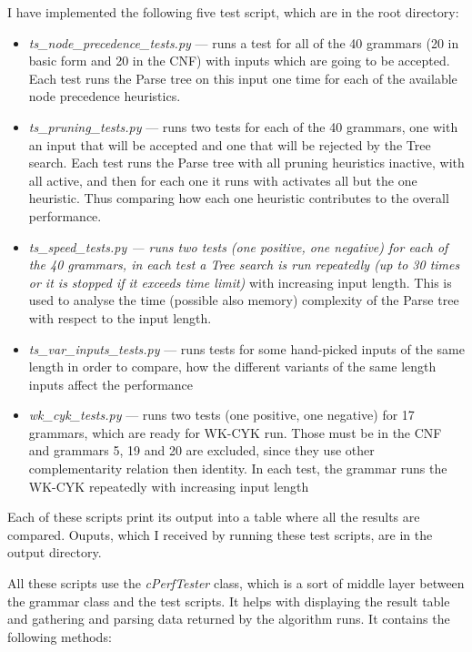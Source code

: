 I have implemented the following five test script, which are in the root directory:
\begin{itemize}
  \item{\textit{ts\_node\_precedence\_tests.py} --- runs a test for all of the 40 grammars (20 in basic form and 20 in the CNF) with inputs which are going to be accepted. Each test runs the Parse tree on this input one time for each of the available node precedence heuristics.}

  \item{\textit{ts\_pruning\_tests.py} --- runs two tests for each of the 40 grammars, one with an input that will be accepted and one that will be rejected by the Tree search. Each test runs the Parse tree with all pruning heuristics inactive, with all active, and then for each one it runs with activates all but the one heuristic. Thus comparing how each one heuristic contributes to the overall performance.}

  \item{\textit{ts\_speed\_tests.py --- runs two tests (one positive, one negative) for each of the 40 grammars, in each test a Tree search is run repeatedly (up to 30 times or it is stopped if it exceeds time limit)} with increasing input length. This is used to analyse the time (possible also memory) complexity of the Parse tree with respect to the input length.}

  \item{\textit{ts\_var\_inputs\_tests.py} --- runs tests for some hand-picked inputs of the same length in order to compare, how the different variants of the same length inputs affect the performance}

  \item{\textit{wk\_cyk\_tests.py} --- runs two tests (one positive, one negative) for 17 grammars, which are ready for WK-CYK run. Those must be in the CNF and grammars 5, 19 and 20 are excluded, since they use other complementarity relation then identity. In each test, the grammar runs the WK-CYK repeatedly with increasing input length}
\end{itemize}

Each of these scripts print its output into a table where all the results are compared. Ouputs, which I received by running these test scripts, are in the output directory.

All these scripts use the \textit{cPerfTester} class, which is a sort of middle layer between the grammar class and the test scripts. It helps with displaying the result table and gathering and parsing data returned by the algorithm runs.
It contains the following methods:

